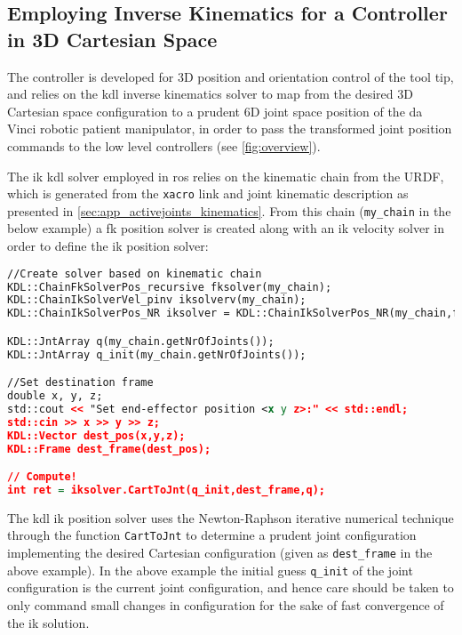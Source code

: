 \subsection{Employing Inverse Kinematics for a Controller in 3D Cartesian Space}
The controller is developed for 3D position and orientation control of the tool tip, and relies on the \gls{kdl} inverse kinematics solver to map from the desired 3D Cartesian space configuration to a prudent 6D joint space position of the da Vinci robotic patient manipulator, in order to pass the transformed joint position commands to the low level controllers (see \autoref{fig:overview}).

The \gls{ik} \gls{kdl} solver employed in \gls{ros} relies on the kinematic chain from the URDF, which is generated from the \texttt{xacro} link and joint kinematic description as presented in %
\autoref{sec:app_activejoints_kinematics}. From this chain (\texttt{my\_chain} in the below example) a \gls{fk} position solver is created along with an \gls{ik} velocity solver in order to define the \gls{ik} position solver:

\begin{lstlisting}[language=xml]
//Create solver based on kinematic chain
KDL::ChainFkSolverPos_recursive fksolver(my_chain);
KDL::ChainIkSolverVel_pinv iksolverv(my_chain);
KDL::ChainIkSolverPos_NR iksolver = KDL::ChainIkSolverPos_NR(my_chain,fksolver,iksolverv,100,1e-6);

KDL::JntArray q(my_chain.getNrOfJoints());
KDL::JntArray q_init(my_chain.getNrOfJoints());

//Set destination frame
double x, y, z;
std::cout << "Set end-effector position <x y z>:" << std::endl;
std::cin >> x >> y >> z;
KDL::Vector dest_pos(x,y,z);
KDL::Frame dest_frame(dest_pos);

// Compute!
int ret = iksolver.CartToJnt(q_init,dest_frame,q);
\end{lstlisting}

The \gls{kdl} \gls{ik} position solver uses the Newton-Raphson iterative numerical technique through the function \texttt{CartToJnt} to determine a prudent joint configuration implementing the desired Cartesian configuration (given as \texttt{dest\_frame} in the above example). In the above example the initial guess \texttt{q\_init} of the joint configuration is the current joint configuration, and hence care should be taken to only command small changes in configuration for the sake of fast convergence of the \gls{ik} solution.


